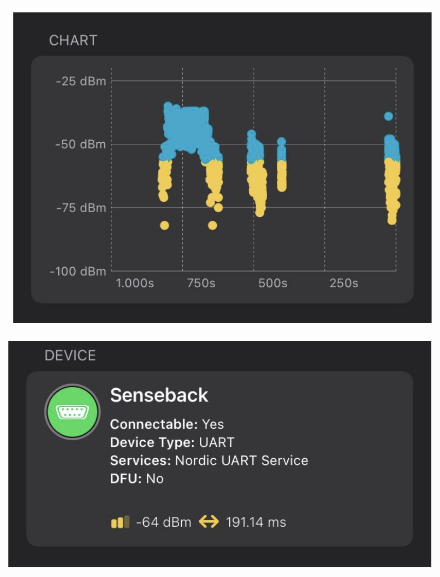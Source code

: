 \documentclass{Configuration_Files/PoliMi3i_thesis}
\begin{document}
\begin{figure}[H]
    \centering
    \includegraphics[scale=0.3]{Multicentral/8.png}
    \label{fig:nrf_connect_advertisements}
\end{figure}

\begin{figure}[H]
    \centering
    \includegraphics[scale=0.3]{Multicentral/9.png}
    \label{fig:multicentral_implementation}
\end{figure}
\end{document}
